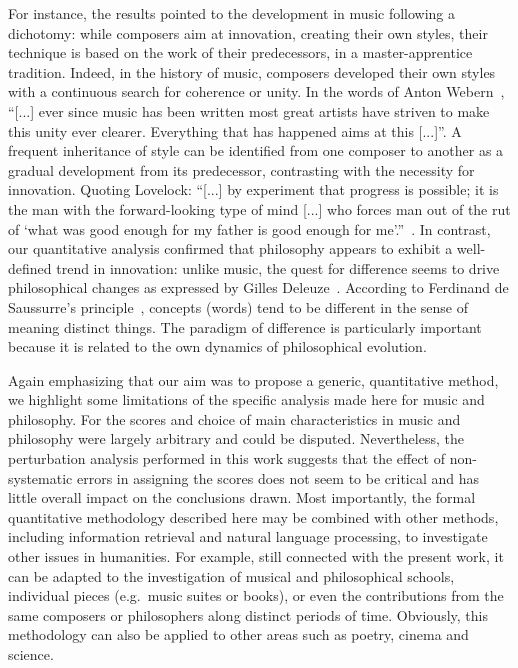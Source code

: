 \documentclass[
 aip,
 jmp,
 amsmath,amssymb,
 reprint,
]{revtex4-1}
\begin{document}
For instance, the results pointed to the development in music
following a dichotomy: while composers aim at innovation, creating
their own styles, their technique is based on the work of their
predecessors, in a master-apprentice tradition. Indeed, in the history
of music, composers developed their own styles with a continuous
search for coherence or unity. In the words of Anton
Webern~\cite{Webern}, ``[...] ever since music has been written most
great artists have striven to make this unity ever clearer. Everything
that has happened aims at this [...]''. A frequent inheritance of
style can be identified from one composer to another as a gradual
development from its predecessor, contrasting with the necessity for
innovation. Quoting Lovelock: ``[...] by experiment that progress is
possible; it is the man with the forward-looking type of mind [...]
who forces man out of the rut of `what was good enough for my father
is good enough for me'.''~\cite{Lovelock}. In contrast, our
quantitative analysis confirmed that philosophy appears to exhibit a
well-defined trend in innovation: unlike music, the quest for
difference seems to drive philosophical changes as expressed by Gilles
Deleuze~\cite{Deleuze}. According to Ferdinand de Saussurre's
principle~\cite{Saussure}, concepts (words) tend to be different in
the sense of meaning distinct things.  The paradigm of difference is
particularly important because it is related to the own dynamics of
philosophical evolution.

Again emphasizing that our aim was to propose a generic, quantitative
method, we highlight some limitations of the specific analysis made
here for music and philosophy. For the scores and choice of main
characteristics in music and philosophy were largely arbitrary and
could be disputed. Nevertheless, the perturbation analysis performed
in this work suggests that the effect of non-systematic errors in
assigning the scores does not seem to be critical and has little
overall impact on the conclusions drawn. Most importantly, the formal
quantitative methodology described here may be combined with other
methods, including information retrieval and natural language
processing, to investigate other issues in humanities. For example,
still connected with the present work, it can be adapted to the
investigation of musical and philosophical schools, individual pieces
(e.g.\ music suites or books), or even the contributions from the same
composers or philosophers along distinct periods of time. Obviously,
this methodology can also be applied to other areas such as poetry,
cinema and science.
 
\end{document}
